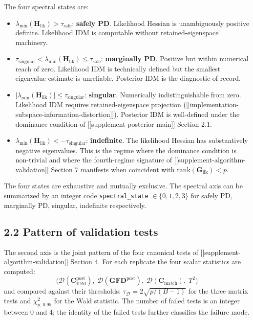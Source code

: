\documentclass[11pt]{article}
\begin{document}
The four spectral states are:
\begin{itemize}
\item $\lambda_{\min}(\mathbf H_{\mathrm{lik}}) > \tau_{\mathrm{safe}}$:
  \textbf{safely PD}. Likelihood Hessian is unambiguously positive
  definite. Likelihood IDM is computable without retained-eigenspace
  machinery.
\item $\tau_{\mathrm{singular}} < \lambda_{\min}(\mathbf H_{\mathrm{lik}}) \leq \tau_{\mathrm{safe}}$:
  \textbf{marginally PD}. Positive but within numerical reach of zero.
  Likelihood IDM is technically defined but the smallest eigenvalue
  estimate is unreliable. Posterior IDM is the diagnostic of record.
\item $|\lambda_{\min}(\mathbf H_{\mathrm{lik}})| \leq \tau_{\mathrm{singular}}$:
  \textbf{singular}. Numerically indistinguishable from zero.
  Likelihood IDM requires retained-eigenspace projection
  ([[implementation-subspace-information-distortion]]). Posterior IDM
  is well-defined under the dominance condition of
  [[supplement-posterior-main]] Section 2.1.
\item $\lambda_{\min}(\mathbf H_{\mathrm{lik}}) < -\tau_{\mathrm{singular}}$:
  \textbf{indefinite}. The likelihood Hessian has substantively
  negative eigenvalues. This is the regime where the dominance
  condition is non-trivial and where the fourth-regime signature of
  [[supplement-algorithm-validation]] Section 7 manifests when
  coincident with $\mathrm{rank}(\mathbf G_{\mathrm{lik}}) < p$.
\end{itemize}

The four states are exhaustive and mutually exclusive. The spectral
axis can be summarized by an integer code
\texttt{spectral\_state} $\in \{0, 1, 2, 3\}$ for safely PD, marginally
PD, singular, indefinite respectively.

\subsection*{2.2 Pattern of validation tests}
\label{sec:sc-validation-axis}

The second axis is the joint pattern of the four canonical tests of
[[supplement-algorithm-validation]] Section 4. For each replicate
the four scalar statistics are computed:
\begin{equation}
\bigl(
\mathcal D(\mathbf C_{\mathrm{IDM}}^{\mathrm{post}}),\;
\mathcal D(\mathbf{GFD}^{\mathrm{post}}),\;
\mathcal D(\mathbf C_{\mathrm{match}}),\;
T^2
\bigr)
\label{eq:sc-four-tests}
\end{equation}
and compared against their thresholds:
$\tau_{\mathcal D} = 2\sqrt{p/(B-1)}$ for the three matrix tests and
$\chi^2_{p,\,0.95}$ for the Wald statistic. The number of failed
tests is an integer between 0 and 4; the identity of the failed
tests further classifies the failure mode.
\end{document}
